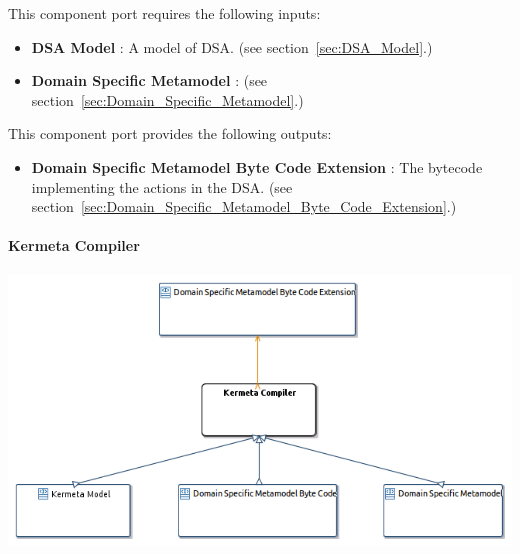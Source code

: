 \documentclass{gemoc} %
\begin{document}
This component port requires the following inputs:
\begin{itemize}
  \item \textbf{DSA Model} :
A model of DSA.
(see section~\ref{sec:DSA_Model}.)
  \item \textbf{Domain Specific Metamodel} :
(see section~\ref{sec:Domain_Specific_Metamodel}.)
\end{itemize}

This component port provides the following outputs:
\begin{itemize}
  \item \textbf{Domain Specific Metamodel Byte Code Extension} :
The bytecode implementing the actions in the DSA.
(see section~\ref{sec:Domain_Specific_Metamodel_Byte_Code_Extension}.)
\end{itemize}

\paragraph{Kermeta Compiler}
\label{sec:Kermeta_Compiler}


\begin{center}
\includegraphics*[trim=0.0cm 0.0cm 0cm 0.0cm, clip=true]{../images/generated/Generated_Kermeta_Compiler.png}
\end{center}
\end{document}
